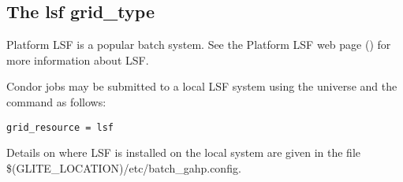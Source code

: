 
\subsection{\label{sec:LSF}The lsf grid\_type }

Platform LSF is a popular batch system. See the Platform LSF web page
()
for more information about LSF.

Condor jobs may be submitted to a local LSF system
using the  universe and the
 command as follows:
\begin{verbatim}
grid_resource = lsf
\end{verbatim}

Details on where LSF is installed on the local system are
given in the file \$(GLITE\_LOCATION)/etc/batch_gahp.config.
